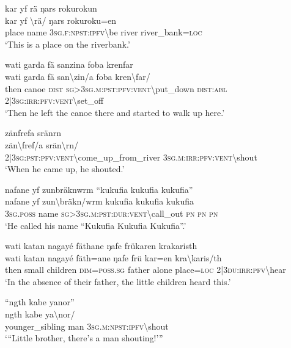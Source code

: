 \ea\label{ex:9:a2248}
kar yf rä ŋars rokurokun\\
\gll kar	yf	{\textbackslash}rä/	ŋars	rokuroku=en\\
     place	name	3\textsc{sg}.\textsc{f}:\textsc{npst}:\textsc{ipfv}{\textbackslash}be	river	river\_bank=\textsc{loc}\\
\glt `This is a place on the riverbank.'
\z

\ea\label{ex:9:a2249}
wati garda fä sanzina foba krenfar\\
\gll wati	garda	fä	san{\textbackslash}zin/a	foba	kren{\textbackslash}far/\\
     then	canoe	\textsc{dist}	\textsc{sg}>3\textsc{sg}.\textsc{m}:\textsc{pst}:\textsc{pfv}:\textsc{vent}{\textbackslash}put\_down	\textsc{dist}:\textsc{abl}	2|3\textsc{sg}:\textsc{irr}:\textsc{pfv}:\textsc{vent}{\textbackslash}set\_off\\
\glt `Then he left the canoe there and started to walk up here.'
\z

\ea\label{ex:9:a2250}
zänfrefa sränrn\\
\gll zän{\textbackslash}fref/a	srän{\textbackslash}rn/\\
     2|3\textsc{sg}:\textsc{pst}:\textsc{pfv}:\textsc{vent}{\textbackslash}come\_up\_from\_river	3\textsc{sg}.\textsc{m}:\textsc{irr}:\textsc{pfv}:\textsc{vent}{\textbackslash}shout\\
\glt `When he came up, he shouted.'
\z

\ea\label{ex:9:a2251}
nafane yf zunbräknwrm ``kukufia kukufia kukufia''\\
\gll nafane	yf	zun{\textbackslash}bräkn/wrm	kukufia	kukufia	kukufia\\
     3\textsc{sg}.\textsc{poss}	name	\textsc{sg}>3\textsc{sg}.\textsc{m}:\textsc{pst}:\textsc{dur}:\textsc{vent}{\textbackslash}call\_out	\textsc{pn}	\textsc{pn}	\textsc{pn}\\
\glt `He called his name ``Kukufia Kukufia Kukufia''.'
\z

\ea\label{ex:9:a2255}
wati katan nagayé fäthane ŋafe frükaren krakaristh\\
\gll wati	katan	nagayé	fäth=ane	ŋafe	frü	kar=en	kra{\textbackslash}karis/th\\
     then	small	children	\textsc{dim}=\textsc{poss}.\textsc{sg}	father	alone	place=\textsc{loc}	2|3\textsc{du}:\textsc{irr}:\textsc{pfv}{\textbackslash}hear\\
\glt `In the absence of their father, the little children heard this.'
\z

\ea\label{ex:9:a2256}
``ngth kabe yanor''\\
\gll ngth	kabe	ya{\textbackslash}nor/\\
     younger\_sibling	man	3\textsc{sg}.\textsc{m}:\textsc{npst}:\textsc{ipfv}{\textbackslash}shout\\
\glt `{``}Little brother, there's a man shouting!'''
\z

